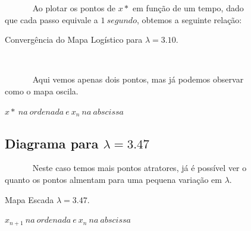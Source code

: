 \documentclass[pdftex,12pt,a4paper]{article}
\begin{document}
\begin{figure}
~~~~~~ Ao plotar os pontos de $x*$ em função de um tempo, dado que cada passo equivale a $1\ segundo$, obtemos a seguinte relação:

\centering
\caption{Convergência do Mapa Logístico para $\lambda = 3.10$.}
\caption*{$x*\ na\ ordenada\ e\ x_{n}\ na\ abscissa$ }\ 

~~~~~~ Aqui vemos apenas dois pontos, mas já podemos observar como o mapa oscila.
\end{figure}

\begin{figure}
\subsection{Diagrama para $\lambda = 3.47$}

~~~~~~ Neste caso temos mais pontos atratores, já é possível ver o quanto os pontos almentam para uma pequena variação em $\lambda$.

\centering
\caption{Mapa Escada $\lambda = 3.47$.}
\caption*{$x_{n+1}\ na\ ordenada\ e\ x_{n}\ na\ abscissa$ }
\end{figure}
\end{document}
